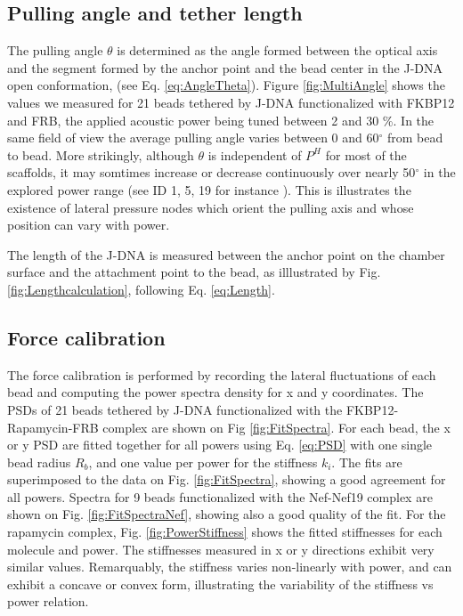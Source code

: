\documentclass{biophys-new}
\begin{document}
\subsection*{Pulling angle and tether length}
The pulling angle $\theta$ is determined as the angle formed between the optical axis and the segment formed by the anchor point and the bead center in the J-DNA open conformation, (see Eq. \ref{eq:AngleTheta}). Figure \ref{fig:MultiAngle} shows the values we measured for 21 beads tethered by J-DNA functionalized with FKBP12 and FRB, the applied acoustic power being tuned between 2 and 30 \%. In the same field of view the average pulling angle varies between 0 and 60$^{\circ}$ from bead to bead. More strikingly, although $\theta$ is independent of $P^H$ for most of the scaffolds, it may somtimes increase or decrease continuously over nearly 50$^{\circ}$ in the explored power range (see ID 1, 5, 19 for instance ). This is illustrates the existence of lateral pressure nodes which orient the pulling axis and whose position can vary with power.

The length of the J-DNA is measured between the anchor point on the chamber surface and the attachment point to the bead, as illlustrated by Fig. \ref{fig:Lengthcalculation}, following Eq. \ref{eq:Length}.


\subsection*{Force calibration}
The force calibration is performed by recording the lateral fluctuations of each bead and computing the power spectra density for x and y coordinates. The PSDs of 21 beads  tethered by J-DNA functionalized with the FKBP12-Rapamycin-FRB complex are shown on Fig \ref{fig:FitSpectra}. For each bead, the x or y PSD are fitted together for all powers using Eq. \ref{eq:PSD} with one single bead radius $R_b$, and one value per power for the stiffness $k_i$. The fits are superimposed to the data on Fig. \ref{fig:FitSpectra}, showing a good agreement for all powers. Spectra for 9 beads functionalized with the Nef-Nef19 complex are shown on Fig. \ref{fig:FitSpectraNef}, showing also a good quality of the fit.
For the rapamycin complex, Fig. \ref{fig:PowerStiffness} shows the fitted stiffnesses for each molecule and power. The stiffnesses measured in x or y directions exhibit very similar values. Remarquably, the stiffness varies non-linearly with power, and can exhibit a concave or convex form, illustrating the variability of the stiffness vs power relation.
\end{document}
